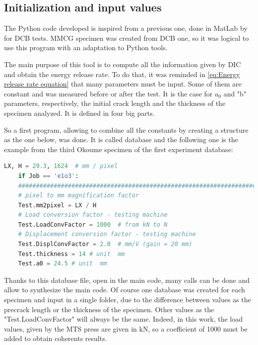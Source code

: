 
\subsection{Initialization and input values}

The Python code developed is inspired from a previous one, done in MatLab by \parencite{Reference14} for DCB tests. MMCG specimen was created from DCB one, so it was logical to use this program with an adaptation to Python tools. 

The main purpose of this tool is to compute all the information given by DIC and obtain the energy release rate. To do that, it was reminded in \ref{eq:Energy release rate equation} that many parameters must be input. Some of them are constant and was measured before or after the test. It is the case for $a_{0}$ and "b" parameters, respectively, the initial crack length and the thickness of the specimen analyzed. It is defined in four big parts.

So a first program, allowing to combine all the constants by creating a structure as the one below, was done. It is called database and the following one is the example from the third Okoume specimen of the first experiment database:



\begin{lstlisting}[language=Python]
	LX, H = 29.3, 1624  # mm / pixel
	if Job == 'e1o3':
	##########################################################################
	# pixel to mm magnification factor
	Test.mm2pixel = LX / H
	# Load conversion factor - testing machine
	Test.LoadConvFactor = 1000  # from kN to N
	# Displacement conversion factor - testing machine
	Test.DisplConvFactor = 2.0  # mm/V (gain = 20 mm)
	Test.thickness = 14 # unit  mm
	Test.a0 = 24.5 # unit  mm
\end{lstlisting}



Thanks to this database file, open in the main code, many calls can be done and allow to synthesize the main code. Of course one database was created for each specimen and input in a single folder, due to the difference between values as the precrack length or the thickness of the specimen. Other values as the "Test.LoadConvFactor" will always be the same. Indeed, in this work, the load values, given by the MTS press are given in \si{\kilo\newton}, so a coefficient of 1000 must be added to obtain coherents results.

